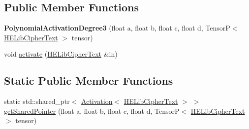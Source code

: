 \subsection*{Public Member Functions}
\begin{DoxyCompactItemize}
\item 
\mbox{\label{classPolynomialActivationDegree3_3_01HELibCipherText_01_4_a2aa870b7e2b201348b3a51e73d0b7169}} 
{\bfseries Polynomial\+Activation\+Degree3} (float a, float b, float c, float d, TensorP$<$ \hyperlink{classHELibCipherText}{H\+E\+Lib\+Cipher\+Text} $>$ tensor)
\item 
void \hyperlink{classPolynomialActivationDegree3_3_01HELibCipherText_01_4_ae9d94218a926c13f7388f7acc6c94177}{activate} (\hyperlink{classHELibCipherText}{H\+E\+Lib\+Cipher\+Text} \&in)
\end{DoxyCompactItemize}
\subsection*{Static Public Member Functions}
\begin{DoxyCompactItemize}
\item 
static std\+::shared\+\_\+ptr$<$ \hyperlink{classActivation}{Activation}$<$ \hyperlink{classHELibCipherText}{H\+E\+Lib\+Cipher\+Text} $>$ $>$ \hyperlink{classPolynomialActivationDegree3_3_01HELibCipherText_01_4_a9fe58f7afffd16f4b634f211059bb262}{get\+Shared\+Pointer} (float a, float b, float c, float d, TensorP$<$ \hyperlink{classHELibCipherText}{H\+E\+Lib\+Cipher\+Text} $>$ tensor)
\end{DoxyCompactItemize}
